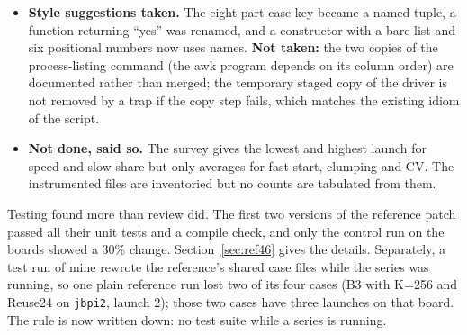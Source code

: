 \documentclass[11pt,a4paper]{article}
\begin{document}
\begin{itemize}
  the boards alternate launch by launch instead of one after the other; four launches per board instead of three.
  \item \textbf{Style suggestions taken.} The eight-part case key became a named tuple, a function returning ``yes'' was renamed, and a
  constructor with a bare list and six positional numbers now uses names. \textbf{Not taken:} the two copies of the process-listing command
  (the awk program depends on its column order) are documented rather than merged; the temporary staged copy of the driver is not
  removed by a trap if the copy step fails, which matches the existing idiom of the script.
  \item \textbf{Not done, said so.} The survey gives the lowest and highest launch for speed and slow share but only averages for fast start, clumping and CV.
  The instrumented files are inventoried but no counts are tabulated from them.
\end{itemize}
Testing found more than review did. The first two versions of the reference patch passed all their unit tests and a compile check, and only the control run on the
boards showed a 30\% change. Section~\ref{sec:ref46} gives the details. Separately, a test run of mine rewrote the reference's shared case files while
the series was running, so one plain reference run lost two of its four cases (B3 with K=256 and Reuse24 on \texttt{jbpi2}, launch 2); those two
cases have three launches on that board. The rule is now written down: no test suite while a series is running.
\end{document}
